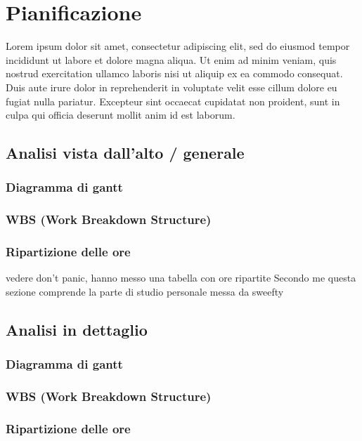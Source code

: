 \newpage
\section{Pianificazione} \label{Pianificazione}
	
		Lorem ipsum dolor sit amet, consectetur adipiscing elit, sed do eiusmod tempor incididunt ut labore et dolore magna aliqua. Ut enim ad minim veniam, quis nostrud exercitation ullamco laboris nisi ut aliquip ex ea commodo consequat. Duis aute irure dolor in reprehenderit in voluptate velit esse cillum dolore eu fugiat nulla pariatur. Excepteur sint occaecat cupidatat non proident, sunt in culpa qui officia deserunt mollit anim id est laborum.
		
		\subsection{Analisi vista dall'alto / generale}
			\subsubsection{Diagramma di gantt}
			\subsubsection{WBS (Work Breakdown Structure)}
			\subsubsection{Ripartizione delle ore}
				vedere don't panic, hanno messo una tabella con ore ripartite
				Secondo me questa sezione comprende la parte di studio personale messa da sweefty
				
		\subsection{Analisi in dettaglio}
			\subsubsection{Diagramma di gantt}
			\subsubsection{WBS (Work Breakdown Structure)}
			\subsubsection{Ripartizione delle ore}

